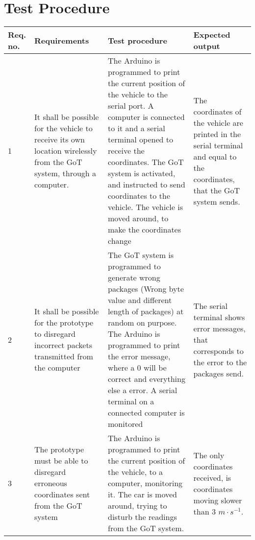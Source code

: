 \section{Test Procedure}\label{cha:TestProcedure}

\begin{table}[H] \centering
\begin{tabular}{|p{2cm}|p{5cm}|p{6cm}|p{3cm}|}
\hline%
\textbf{Req. no.}  &  \textbf{Requirements} &  \textbf{Test procedure}  &  \textbf{Expected output}        \\
\hline%
           1    &   It shall be possible for the vehicle to receive its own location wirelessly from the GoT system, through a computer.   &   The Arduino is programmed to print the current position of the vehicle to the serial port. A computer is connected to it and a serial terminal opened to receive the coordinates. The GoT system is activated, and instructed to send coordinates to the vehicle. The vehicle is moved around, to make the coordinates change   &   The coordinates of the vehicle are printed in the serial terminal and equal to the coordinates, that the GoT system sends. \\
\hline%
           2    &   It shall be possible for the prototype to disregard incorrect packets transmitted from the computer   &   The GoT system is programmed to generate wrong packages (Wrong byte value and different length of packages) at random on purpose. The Arduino is programmed to print the error message, where a 0 will be correct and everything else a error. A serial terminal on a connected computer is monitored  &  The serial terminal shows error messages, that corresponds to the error to the packages send. \\
\hline%
           3    &   The prototype must be able to disregard erroneous coordinates sent from the GoT system   &    The Arduino is programmed to print the current position of the vehicle, to a computer, monitoring it. The car is moved around, trying to disturb the readings from the GoT system. &  The only coordinates received, is coordinates moving slower than 3 $m \cdot s^{-1}$. \\

\end{tabular}
\end{table}

